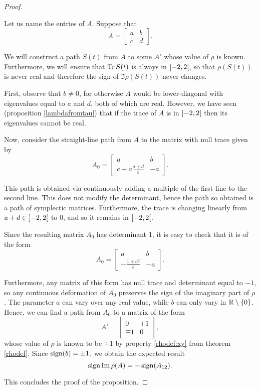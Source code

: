 \begin{proof}
\begin{lemmaproof}
Let us name the entries of $A$. Suppose that
\begin{equation}
A = \begin{bmatrix}
a & b\\
c & d
\end{bmatrix}.
\end{equation}

We will construct a path $S(t)$ from $A$ to some $A'$ whose value of $\rho$ is known. Furthermore, we will ensure that $\operatorname{Tr} S(t)$ is always in $\ointerval{-2}2$, so that $\rho(S(t))$ is never real and therefore the sign of $\Im \rho(S(t))$ never changes.

First, observe that $b \neq 0$, for otherwise $A$ would be lower-diagonal with eigenvalues equal to $a$ and $d$, both of which are real. However, we have seen (proposition \ref{lambdafromtau}) that if the trace of $A$ is in $\ointerval{-2}2$ then its eigenvalues cannot be real.

Now, consider the straight-line path from $A$ to the matrix with null trace given by
\begin{equation}
A_0 = \begin{bmatrix}
a & b\\
c-a \frac{a+d}b & -a
\end{bmatrix}.
\end{equation}

This path is obtained via continuously adding a multiple of the first line to the second line. This does not modify the determinant, hence the path so obtained is a path of symplectic matrices. Furthermore, the trace is changing linearly from $a+d \in \ointerval{-2}2$ to $0$, and so it remains in $\ointerval{-2}2$.

Since the resulting matrix $A_0$ has determinant 1, it is easy to check that it is of the form
\begin{equation}
A_0 = \begin{bmatrix}
a & b\\
-\frac{1+a^2}b & -a
\end{bmatrix}.
\end{equation}

Furthermore, any matrix of this form has null trace and determinant equal to $-1$, so any continuous deformation of $A_0$ preserves the sign of the imaginary part of $\rho$. The parameter $a$ can vary over any real value, while $b$ can only vary in $\mathbb{R} \setminus \{0\}$. Hence, we can find a path from $A_0$ to a matrix of the form
\begin{equation}
A' = \begin{bmatrix}
0 & \pm 1\\
\mp 1 & 0
\end{bmatrix},
\end{equation}
whose value of $\rho$ is known to be $\mp 1$ by property \ref{rhodef:xy} from theorem \ref{rhodef}. Since $\operatorname{sign}(b) = \pm 1$, we obtain the expected result
\begin{equation}
\operatorname{sign} \operatorname{Im} \rho(A) = - \operatorname{sign}(A_{12}).
\end{equation}
\end{lemmaproof}
This concludes the proof of the proposition.
\end{proof}

